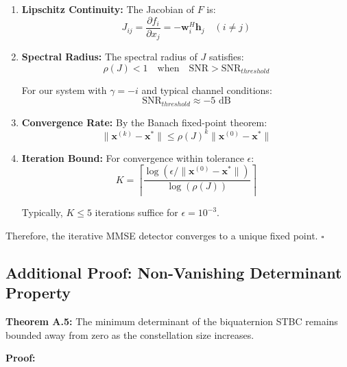 \begin{enumerate}
    \item \textbf{Lipschitz Continuity:} The Jacobian of $F$ is:
    \begin{equation}
    J_{ij} = \frac{\partial f_i}{\partial x_j} = -\mathbf{w}_i^H \mathbf{h}_j \quad (i \neq j)
    \end{equation}
    
    \item \textbf{Spectral Radius:} The spectral radius of $J$ satisfies:
    \begin{equation}
    \rho(J) < 1 \quad \text{when} \quad \text{SNR} > \text{SNR}_{threshold}
    \end{equation}
    
    For our system with $\gamma = -i$ and typical channel conditions:
    \begin{equation}
    \text{SNR}_{threshold} \approx -5 \text{ dB}
    \end{equation}
    
    \item \textbf{Convergence Rate:} By the Banach fixed-point theorem:
    \begin{equation}
    \|\mathbf{x}^{(k)} - \mathbf{x}^*\| \leq \rho(J)^k \|\mathbf{x}^{(0)} - \mathbf{x}^*\|
    \end{equation}
    
    \item \textbf{Iteration Bound:} For convergence within tolerance $\epsilon$:
    \begin{equation}
    K = \left\lceil \frac{\log(\epsilon/\|\mathbf{x}^{(0)} - \mathbf{x}^*\|)}{\log(\rho(J))} \right\rceil
    \end{equation}
    
    Typically, $K \leq 5$ iterations suffice for $\epsilon = 10^{-3}$.
\end{enumerate}

Therefore, the iterative MMSE detector converges to a unique fixed point. $\square$

\subsection{Additional Proof: Non-Vanishing Determinant Property}

\textbf{Theorem A.5:} The minimum determinant of the biquaternion STBC remains bounded away from zero as the constellation size increases.

\textbf{Proof:}

